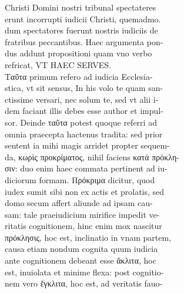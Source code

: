 \documentclass{article}
\begin{document}
\begin{pages}
                Christi Domini nostri tribunal spectateres \\
                erunt incorrupti iudicii Christi, quemadmo. \\
                dum spectatores fuerunt nostris iudiciis de \\
                fratribus peccantibus. Haec argumenta pon- \\
                dus addunt propositioni quam vno verbo \\
                refricat, VT HAEC SERVES. \\
                Ταῦτα primum refero ad iudicia Ecclesia- \\
                stica, vt sit sensus, In his volo te quam san- \\
                ctissime versari, nec solum te, sed vt alii i- \\
                dem faciant illis debes esse author et impul- \\
                sor. Deinde ταῦτα potest quoque referri ad \\
                omnia praecepta hactenus tradita: sed prior \\
                sentent ia mihi magis arridet propter sequem- \\
                da,  κωρὶς προκρίματος, nihil faciens κατά πρόκλη- \\
                σιν: duo enim haec commata pertinent ad iu- \\
                diciorum formam. Πρόκριμα dicitur, quod \\
                iudex sumit sibi non ex actis et prolatis, sed \\
                domo secum affert aliunde ad ipsam cau- \\
                sam: tale praeiudicium mirifice impedit ve- \\
                ritatis cognitionem, hinc enim mox nascitur \\
                πρόκλησις, hoc est, inclinatio in vnam partem, \\
                causa etiam nondum cognita quum iudicia \\
                ante cognitionem debeant esse ἄκλιτα, hoc \\
                est, inuiolata et minime flexa: post cognitio- \\
                nem vero ἔγκλιτα, hoc est, ad veritatis fauo- \\

\end{pages}
\end{document}
